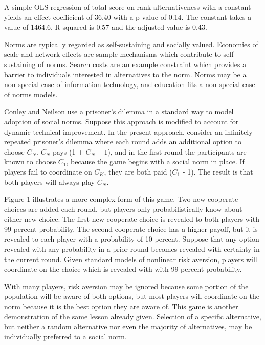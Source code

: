\documentclass[AER]{./aea-latex-templates/AEA}
\begin{document}
A simple OLS regression of total score on rank alternativeness with a
constant yields an effect coefficient of 36.40 with a p-value of 0.14. The
constant takes a value of 1464.6. R-squared is 0.57 and the adjusted value
is 0.43.

Norms are typically regarded as self-sustaining and socially
valued\cite{dequech2006institutions}. Economies of scale and
network effects are sample mechanisms which contribute to
self-sustaining of norms. Search costs are an example constraint
which provides a barrier to individuals interested in alternatives
to the norm. Norms may be a non-special case of
information technology, and education fits a non-special case of norms models.

Conley and Neilson use a prisoner’s dilemma in a standard way to model adoption
of social norms\cite{conley2009endogenous}. Suppose this approach is modified
to account for dynamic technical improvement. In the present
approach, consider an infinitely repeated prisoner’s dilemma where each
round adds an additional option to choose $C_N$. $C_N$ pays
(1 + $C_N-1$), and in the first round the participants are known to
choose $C_1$, because the game begins with a social norm in place.
If players fail to coordinate on $C_K$, they are both paid ($C_1$ - 1).
The result is that both players will always play $C_N$.

Figure 1 illustrates a more complex form of this game. Two new cooperate
choices are added each round, but
players only probabilistically know about either new choice. The first new cooperate choice is
revealed to both players with 99 percent probability. The second cooperate
choice has a higher payoff, but it is revealed to
each player with a probability of 10 percent. Suppose that any option
revealed with any probability in a prior round becomes revealed with certainty in the current round. Given standard models of nonlinear
risk aversion, players will coordinate on the choice which is revealed
with with 99 percent probability.

With many players, risk aversion may be ignored because
some portion of the population will be aware of both options, but most
players will coordinate on the norm because it is the best option they are aware of.
This game is another demonstration of the same lesson already given. Selection of
a specific alternative, but neither a random alternative nor even the majority of
alternatives, may be individually preferred to a social norm.
\end{document}
